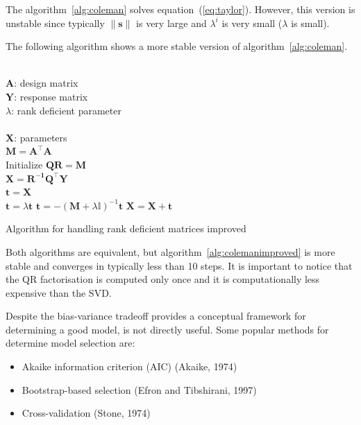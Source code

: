 The algorithm~\ref{alg:coleman} solves equation~(\ref{eq:taylor}). However, this
version is unstable since typically $\|\mathbf{s}\|$ is very large and
$\lambda^i$ is very small ($\lambda$ is small).

The following algorithm shows a more stable version of
algorithm~\ref{alg:coleman}.


\begin{algorithm}[H]
\begin{algorithmic}[1]
\REQUIRE $\,$ \\
$\mathbf{A}$: design matrix \\
$\mathbf{Y}$: response matrix \\
$\lambda$: rank deficient parameter \\
\ENSURE  $\,$ \\
$\mathbf{X}$: parameters \\
\STATE $\mathbf{M}=\mathbf{A^\top A}$ \\
\STATE Initialize $\mathbf{Q R}=\mathbf{M}$ \\
\STATE $\mathbf{X} = \mathbf{R^{-1}Q^\top Y}$ \\
\STATE $\mathbf{t} = \mathbf{X}$ \\
        \STATE $\mathbf{t} =\lambda \mathbf{t}$  
        \STATE $\mathbf{t} =  -(\mathbf{M}+\lambda\mathbb{I})^{-1}\mathbf{t}$
	\STATE $\mathbf{X}=\mathbf{X} + \mathbf{t}$
\ENDFOR
\end{algorithmic}
\caption{Algorithm for handling rank deficient matrices improved}
\label{alg:colemanimproved}
\end{algorithm}

Both algorithms are equivalent, but algorithm~\ref{alg:colemanimproved} is more
stable and converges in typically less than 10 steps.
It is important to notice that the QR factorisation is computed only once and it
is computationally less expensive than the SVD.


Despite the bias-variance tradeoff provides a conceptual framework for
determining a good model, is not directly useful. Some popular methods
for determine model selection are:

\begin{itemize}
    \item Akaike information criterion (AIC) (Akaike, 1974)
    \item Bootstrap-based selection (Efron and Tibshirani, 1997)
    \item Cross-validation (Stone, 1974)
\end{itemize}

